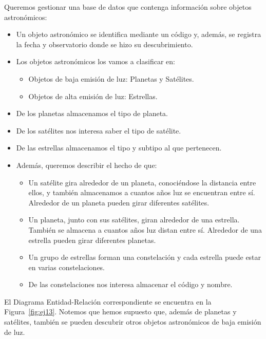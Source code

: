 \begin{ejercicio} \label{ej:13}
    Queremos gestionar una base de datos que contenga información sobre objetos astronómicos:
    \begin{itemize}
        \item Un objeto astronómico se identifica mediante un código y, además, se registra la fecha y observatorio
        donde se hizo su descubrimiento.
        \item Los objetos astronómicos los vamos a clasificar en:
        \begin{itemize}
            \item Objetos de baja emisión de luz: Planetas y Satélites.
            \item Objetos de alta emisión de luz: Estrellas.
        \end{itemize}
        \item De los planetas almacenamos el tipo de planeta.
        \item De los satélites nos interesa saber el tipo de satélite.
        \item De las estrellas almacenamos el tipo y subtipo al que pertenecen.
        \item Además, queremos describir el hecho de que:
        \begin{itemize}
            \item Un satélite gira alrededor de un planeta, conociéndose la distancia entre ellos, y también
            almacenamos a cuantos años luz se encuentran entre sí. Alrededor de un planeta pueden girar
            diferentes satélites.
            \item Un planeta, junto con sus satélites, giran alrededor de una estrella. También se almacena a
            cuantos años luz distan entre sí. Alrededor de una estrella pueden girar diferentes planetas.
            \item Un grupo de estrellas forman una constelación y cada estrella puede estar en varias
            constelaciones.
            \item De las constelaciones nos interesa almacenar el código y nombre.
        \end{itemize}
    \end{itemize}

    El Diagrama Entidad-Relación correspondiente se encuentra en la Figura~\ref{fig:ej13}.
    Notemos que hemos supuesto que, además de planetas y satélites, también se pueden descubrir otros objetos astronómicos de baja emisión de luz.
    \begin{figure}
        \centering
\end{figure}
\end{ejercicio}
